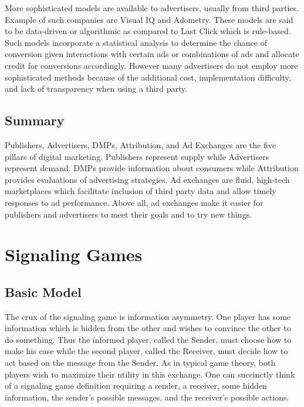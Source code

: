 \documentclass{article}
\begin{document}
More sophisticated models are available to advertisers, usually from third parties. Example of such companies are Visual IQ and Adometry. These models are said to be data-driven or algorithmic as compared to Last Click which is rule-based. Such models incorporate a statistical analysis to determine the chance of conversion given interactions with certain ads or combinations of ads and allocate credit for conversions accordingly. However many advertisers do not employ more sophisticated methods because of the additional cost, implementation difficulty, and lack of transparency when using a third party.

\subsection{Summary}

Publishers, Advertisers, DMPs, Attribution, and Ad Exchanges are the five pillars of digital marketing. Publishers represent supply while Advertisers represent demand. DMPs provide information about consumers while Attribution provides evaluations of advertising strategies. Ad exchanges are fluid, high-tech marketplaces which facilitate inclusion of third party data and allow timely responses to ad performance. Above all, ad exchanges make it easier for publishers and advertisers to meet their goals and to try new things. 

\newpage

\section{Signaling Games}

\subsection{Basic Model}

The crux of the signaling game is information asymmetry. One player has some information which is hidden from the other and wishes to convince the other to do something. Thus the informed player, called the Sender, must choose how to make his case while the second player, called the Receiver, must decide how to act based on the message from the Sender. As in typical game theory, both players wish to maximize their utility in this exchange. One can succinctly think of a signaling game definition requiring a sender, a receiver, some hidden information, the sender's possible messages, and the receiver's possible actions.
\end{document}

